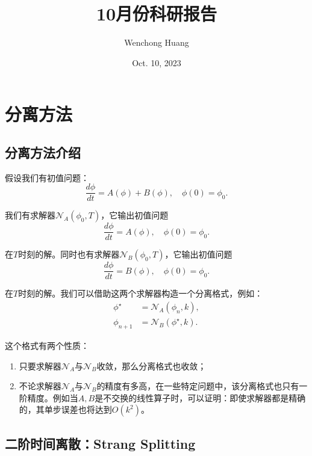 \documentclass[lang=cn,10pt,bibend=bibtex]{elegantbook}
\title{10月份科研报告}
\author{Wenchong Huang}
\date{Oct. 10, 2023}
\begin{document}
\maketitle
\frontmatter

\tableofcontents

\mainmatter

\chapter{分离方法}

\section{分离方法介绍}

假设我们有初值问题：
\begin{equation}
    \frac{d\phi}{dt}=A(\phi)+B(\phi),\quad \phi(0)=\phi_0.
\end{equation}

我们有求解器$\mathcal{N}_A(\phi_0,T)$，它输出初值问题
\begin{equation}
    \frac{d\phi}{dt}=A(\phi),\quad \phi(0)=\phi_0.
\end{equation}

在$T$时刻的解。同时也有求解器$\mathcal{N}_B(\phi_0,T)$，它输出初值问题
\begin{equation}
    \frac{d\phi}{dt}=B(\phi),\quad \phi(0)=\phi_0.
\end{equation}

在$T$时刻的解。我们可以借助这两个求解器构造一个分离格式，例如：
\begin{align*}
    \phi^\star &= \mathcal{N}_A(\phi_n,k),\\
    \phi_{n+1} &= \mathcal{N}_B(\phi^\star,k).
\end{align*}

这个格式有两个性质：
\begin{enumerate}
    \item 只要求解器$\mathcal{N}_A$与$\mathcal{N}_B$收敛，那么分离格式也收敛；
    \item 不论求解器$\mathcal{N}_A$与$\mathcal{N}_B$的精度有多高，在一些特定问题中，该分离格式也只有一阶精度。例如当$A,B$是不交换的线性算子时，可以证明：即使求解器都是精确的，其单步误差也将达到$O(k^2)$。
\end{enumerate}

\section{二阶时间离散：Strang Splitting}
\end{document}
